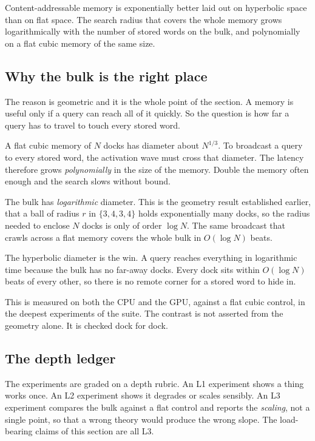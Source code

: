 \begin{result}
Content-addressable memory is exponentially better laid out on hyperbolic space than on flat space. The search radius that covers the whole memory grows logarithmically with the number of stored words on the bulk, and polynomially on a flat cubic memory of the same size.
\end{result}

\subsection{Why the bulk is the right place}

The reason is geometric and it is the whole point of the section. A memory is useful only if a query can reach all of it quickly. So the question is how far a query has to travel to touch every stored word.

A flat cubic memory of $N$ docks has diameter about $N^{1/3}$. To broadcast a query to every stored word, the activation wave must cross that diameter. The latency therefore grows \emph{polynomially} in the size of the memory. Double the memory often enough and the search slows without bound.

The bulk has \emph{logarithmic} diameter. This is the geometry result established earlier, that a ball of radius $r$ in $\{3,4,3,4\}$ holds exponentially many docks, so the radius needed to enclose $N$ docks is only of order $\log N$. The same broadcast that crawls across a flat memory covers the whole bulk in $O(\log N)$ beats.

\begin{principle}
The hyperbolic diameter is the win. A query reaches everything in logarithmic time because the bulk has no far-away docks. Every dock sits within $O(\log N)$ beats of every other, so there is no remote corner for a stored word to hide in.
\end{principle}

This is measured on both the CPU and the GPU, against a flat cubic control, in the deepest experiments of the suite. The contrast is not asserted from the geometry alone. It is checked dock for dock.

\subsection{The depth ledger}

The experiments are graded on a depth rubric. An L1 experiment shows a thing works once. An L2 experiment shows it degrades or scales sensibly. An L3 experiment compares the bulk against a flat control and reports the \emph{scaling}, not a single point, so that a wrong theory would produce the wrong slope. The load-bearing claims of this section are all L3.

